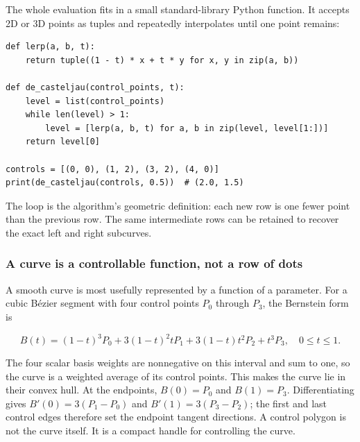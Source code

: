 The whole evaluation fits in a small standard-library Python function. It accepts 2D or 3D points as tuples and repeatedly interpolates until one point remains:

\begin{verbatim}
def lerp(a, b, t):
    return tuple((1 - t) * x + t * y for x, y in zip(a, b))

def de_casteljau(control_points, t):
    level = list(control_points)
    while len(level) > 1:
        level = [lerp(a, b, t) for a, b in zip(level, level[1:])]
    return level[0]

controls = [(0, 0), (1, 2), (3, 2), (4, 0)]
print(de_casteljau(controls, 0.5))  # (2.0, 1.5)
\end{verbatim}

The loop is the algorithm's geometric definition: each new row is one fewer point than the previous row. The same intermediate rows can be retained to recover the exact left and right subcurves.

\subsubsection{A curve is a controllable function, not a row of dots}\label{03-visual-computing-i-ch001-a-curve-is-a-controllable-function-not-a-row-of-dots}

\hypertarget{03-visual-computing-i-ch001-a-curve-is-a-controllable-function-not-a-row-of-dots}{}

A smooth curve is most usefully represented by a function of a parameter. For a cubic Bézier segment with four control points \(P_0\) through \(P_3\), the Bernstein form is

\[
B(t)=(1-t)^3P_0+3(1-t)^2tP_1+3(1-t)t^2P_2+t^3P_3,\quad 0\le t\le1.
\]

The four scalar basis weights are nonnegative on this interval and sum to one, so the curve is a weighted average of its control points. This makes the curve lie in their convex hull. At the endpoints, \(B(0)=P_0\) and \(B(1)=P_3\). Differentiating gives \(B'(0)=3(P_1-P_0)\) and \(B'(1)=3(P_3-P_2)\); the first and last control edges therefore set the endpoint tangent directions. A control polygon is not the curve itself. It is a compact handle for controlling the curve.

